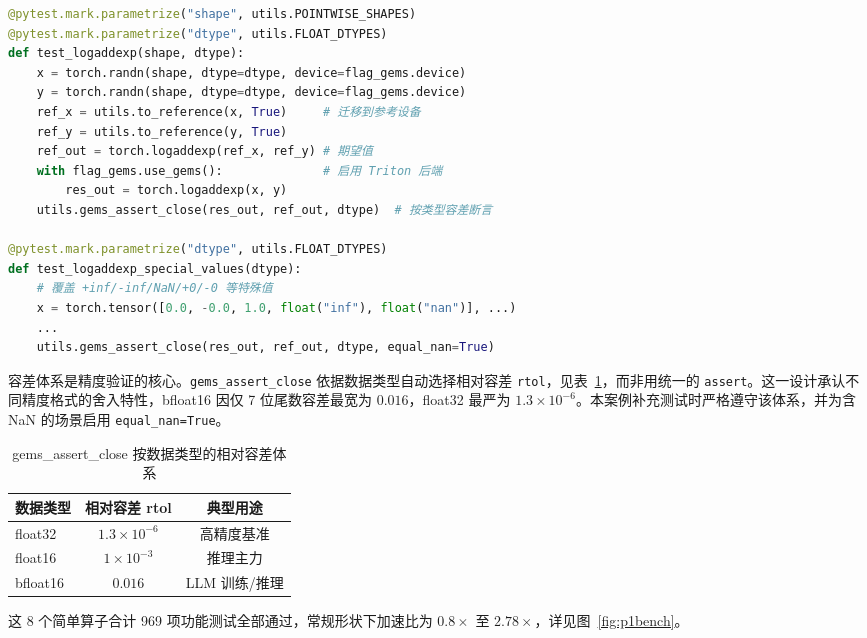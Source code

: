 \begin{lstlisting}[language=Python, caption={逐点算子的典型测试范式（code/tests/test\_logaddexp.py，节选）}, label={code:test}]
@pytest.mark.parametrize("shape", utils.POINTWISE_SHAPES)
@pytest.mark.parametrize("dtype", utils.FLOAT_DTYPES)
def test_logaddexp(shape, dtype):
    x = torch.randn(shape, dtype=dtype, device=flag_gems.device)
    y = torch.randn(shape, dtype=dtype, device=flag_gems.device)
    ref_x = utils.to_reference(x, True)     # 迁移到参考设备
    ref_y = utils.to_reference(y, True)
    ref_out = torch.logaddexp(ref_x, ref_y) # 期望值
    with flag_gems.use_gems():              # 启用 Triton 后端
        res_out = torch.logaddexp(x, y)
    utils.gems_assert_close(res_out, ref_out, dtype)  # 按类型容差断言

@pytest.mark.parametrize("dtype", utils.FLOAT_DTYPES)
def test_logaddexp_special_values(dtype):
    # 覆盖 +inf/-inf/NaN/+0/-0 等特殊值
    x = torch.tensor([0.0, -0.0, 1.0, float("inf"), float("nan")], ...)
    ...
    utils.gems_assert_close(res_out, ref_out, dtype, equal_nan=True)
\end{lstlisting}

容差体系是精度验证的核心。\texttt{gems\_assert\_close} 依据数据类型自动选择相对容差 \texttt{rtol}，见表~\ref{tab:tol}，而非用统一的 \texttt{assert}。这一设计承认不同精度格式的舍入特性，bfloat16 因仅 7 位尾数容差最宽为 $0.016$，float32 最严为 $1.3\times10^{-6}$。本案例补充测试时严格遵守该体系，并为含 NaN 的场景启用 \texttt{equal\_nan=True}。

\begin{table}[!htbp]
\centering\small
\caption{gems\_assert\_close 按数据类型的相对容差体系}
\label{tab:tol}
\renewcommand{\arraystretch}{1.1}
\begin{tabular}{lcc}
\toprule
数据类型 & 相对容差 rtol & 典型用途 \\
\midrule
float32 & $1.3\times 10^{-6}$ & 高精度基准 \\
float16 & $1\times 10^{-3}$ & 推理主力 \\
bfloat16 & $0.016$ & LLM 训练/推理 \\
\bottomrule
\end{tabular}
\end{table}

这 8 个简单算子合计 969 项功能测试全部通过，常规形状下加速比为 $0.8\times$ 至 $2.78\times$，详见图~\ref{fig:p1bench}。

